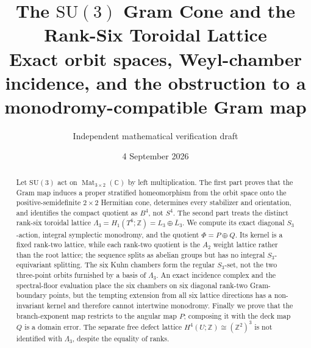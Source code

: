 \documentclass[11pt]{article}
\title{\bfseries The \(\mathrm{SU}(3)\) Gram Cone and the Rank-Six
Toroidal Lattice\\
\large Exact orbit spaces, Weyl-chamber incidence, and the obstruction to
a monodromy-compatible Gram map}
\author{Independent mathematical verification draft}
\date{4 September 2026}
\theoremstyle{definition}
\theoremstyle{remark}
\numberwithin{equation}{section}
\begin{document}
\maketitle

\begin{abstract}
Let \(\mathrm{SU}(3)\) act on
\(\operatorname{Mat}_{3\times2}(\mathbb C)\) by left multiplication.  The
first part proves that the Gram map induces a proper stratified
homeomorphism from the orbit space onto the positive-semidefinite
\(2\times2\) Hermitian cone, determines every stabilizer and orientation,
and identifies the compact quotient as \(B^4\), not \(S^4\).  The second
part treats the distinct rank-six toroidal lattice
\(\Lambda_3=H_1(T^6;\mathbb Z)=L_3\oplus\bar L_3\).  We compute its exact
diagonal \(S_3\)-action, integral symplectic monodromy, and the quotient
\(\Phi=P\oplus Q\).  Its kernel is a fixed rank-two lattice, while each
rank-two quotient is the \(A_2\) weight lattice rather than the root lattice;
the sequence splits as abelian groups but has no integral
\(S_3\)-equivariant splitting.  The six Kuhn chambers form the regular
\(S_3\)-set, not the two three-point orbits furnished by a basis of
\(\Lambda_3\).  An exact incidence complex and the spectral-floor evaluation
place the six chambers on six diagonal rank-two Gram-boundary points, but
the tempting extension from all six lattice directions has a non-invariant
kernel and therefore cannot intertwine monodromy.  Finally we prove that the
branch-exponent map restricts to the angular map \(P\); composing it with the
deck map \(Q\) is a domain error.  The separate free defect lattice
\(H^4(U;\mathbb Z)\cong(\mathbb Z^2)^3\) is not identified with
\(\Lambda_3\), despite the equality of ranks.
\end{abstract}

\medskip
\noindent{}
\end{document}
